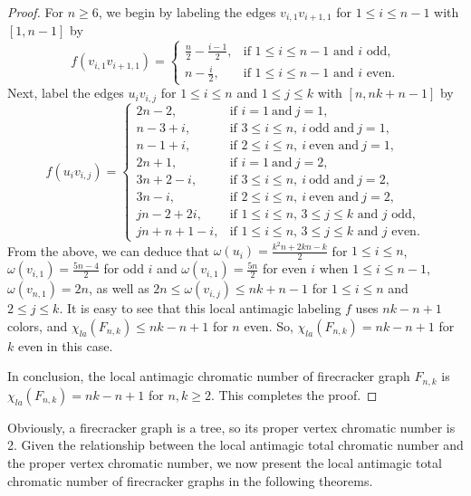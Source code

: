 \documentclass[12pt]{article}
\begin{document}
\begin{proof}
For $n\geq 6$, we begin by labeling the edges $v_{i,1}v_{i+1,1}$ for $1\leq i\leq n-1$ with $[1, n-1]$ by
\begin{equation*}
f(v_{i,1}v_{i+1,1})=\left\{\begin{array}{ll}
\frac{n}{2}-\frac{i-1}{2},  &\text{if $1\leq i\leq n-1$~and~$i$~odd}, \\[3pt]
n-\frac{i}{2}, &\text{if $1\leq i\leq n-1$~and~$i$~even}.
\end{array}
\right.
\end{equation*}
Next, label the edges $u_{i}v_{i,j}$ for $1\leq i\leq n$ and $1\leq j\leq k$ with $[n,nk+n-1]$ by
\begin{equation*}
f(u_{i}v_{i,j})=\left\{\begin{array}{ll}
2n-2, &\text{if }i=1~\text{and}~j=1,\\
n-3+i,  &\text{if }3\leq i\leq n,~i~\text{odd~and}~j=1,\\
n-1+i,  &\text{if }2\leq i\leq n,~i~\text{even~and}~j=1,\\
2n+1,   &\text{if }i=1~\text{and}~j=2,\\
3n+2-i,  &\text{if }3\leq i\leq n,~i~\text{odd~and}~j=2,\\
3n-i,    &\text{if }2\leq i\leq n,~i~\text{even~and}~j=2,\\
jn-2+2i, &\text{if $1\leq i\leq n,\,3\leq j\leq k$~and~$j$~odd},\\
jn+n+1-i, &\text{if $1\leq i\leq n,\,3\leq j\leq k$~and~$j$~even}.
\end{array}\right.
\end{equation*}
From the above, we can deduce that $\omega(u_{i})=\frac{k^{2}n+2kn-k}{2}$ for $1\leq i\leq n$, $\omega(v_{i,1})=\frac{5n-4}{2}$ for odd $i$ and $\omega(v_{i,1})=\frac{5n}{2}$ for even $i$ when $1\leq i\leq n-1$, $\omega(v_{n,1})=2n$, as well as $2n\leq \omega(v_{i,j})\leq nk+n-1$ for $1\leq i\leq n$ and $2\leq j\leq k$.
It is easy to see that this local antimagic labeling $f$ uses $nk-n+1$ colors, and $\chi_{la}(F_{n,k})\leq nk-n+1$ for $n$ even. So,  $\chi_{la}(F_{n,k})=nk-n+1$ for $k$ even in this case.

In conclusion, the local antimagic chromatic number of firecracker graph $F_{n,k}$ is $\chi_{la}(F_{n,k})=nk-n+1$ for $n,k\geq 2$. This completes the proof.
\end{proof}

Obviously, a firecracker graph is a tree, so its proper vertex chromatic number is 2. Given the relationship between the local antimagic total chromatic number and the proper vertex chromatic number, we now present the local antimagic total chromatic number of firecracker graphs in the following theorems.
\end{document}
